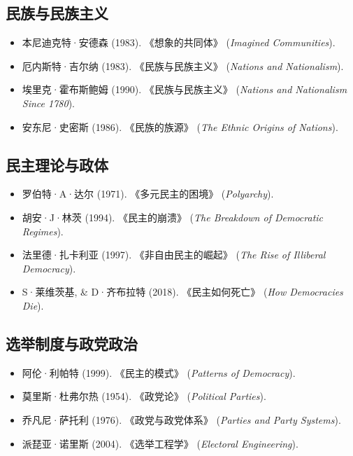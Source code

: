 \documentclass[a5paper, 11pt, openany]{ctexbook}
\begin{document}
\subsection*{民族与民族主义}
\begin{itemize}
    \item 本尼迪克特·安德森 (1983). 《想象的共同体》 (\textit{Imagined Communities}).
    \item 厄内斯特·吉尔纳 (1983). 《民族与民族主义》 (\textit{Nations and Nationalism}).
    \item 埃里克·霍布斯鲍姆 (1990). 《民族与民族主义》 (\textit{Nations and Nationalism Since 1780}).
    \item 安东尼·史密斯 (1986). 《民族的族源》 (\textit{The Ethnic Origins of Nations}).
\end{itemize}

\subsection*{民主理论与政体}
\begin{itemize}
    \item 罗伯特·A·达尔 (1971). 《多元民主的困境》 (\textit{Polyarchy}).
    \item 胡安·J·林茨 (1994). 《民主的崩溃》 (\textit{The Breakdown of Democratic Regimes}).
    \item 法里德·扎卡利亚 (1997). 《非自由民主的崛起》 (\textit{The Rise of Illiberal Democracy}).
    \item S·莱维茨基, \& D·齐布拉特 (2018). 《民主如何死亡》 (\textit{How Democracies Die}).
\end{itemize}

\subsection*{选举制度与政党政治}
\begin{itemize}
    \item 阿伦·利帕特 (1999). 《民主的模式》 (\textit{Patterns of Democracy}).
    \item 莫里斯·杜弗尔热 (1954). 《政党论》 (\textit{Political Parties}).
    \item 乔凡尼·萨托利 (1976). 《政党与政党体系》 (\textit{Parties and Party Systems}).
    \item 派琵亚·诺里斯 (2004). 《选举工程学》 (\textit{Electoral Engineering}).
\end{itemize}
\end{document}
